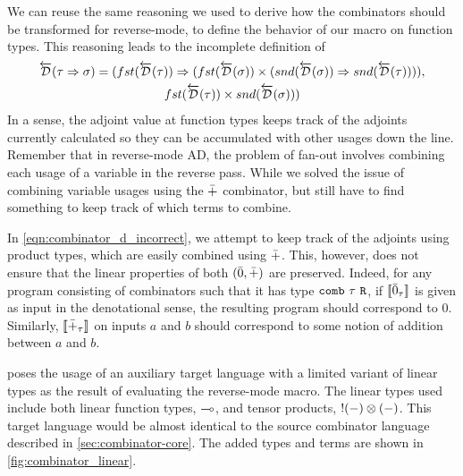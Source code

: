   We can reuse the same reasoning we used to derive how the combinators should be transformed for reverse-mode, to define the behavior of our macro on function types.
  This reasoning leads to the incomplete definition of
  \begin{multline}
    \overleftarrow{\mathcal{D}}(\tau \Rightarrow \sigma) = (fst(\overleftarrow{\mathcal{D}}(\tau)) \Rightarrow (fst(\overleftarrow{\mathcal{D}}(\sigma)) \times (snd(\overleftarrow{\mathcal{D}}(\sigma)) \Rightarrow snd(\overleftarrow{\mathcal{D}}(\tau)))),
      \\ fst(\overleftarrow{\mathcal{D}}(\tau)) \times snd (\overleftarrow{\mathcal{D}}(\sigma)))
    \label{eqn:combinator_d_incorrect}
  \end{multline}
  In a sense, the adjoint value at function types keeps track of the adjoints currently calculated so they can be accumulated with other usages down the line.
  Remember that in reverse-mode AD, the problem of fan-out involves combining each usage of a variable in the reverse pass.
  While we solved the issue of combining variable usages using the $\bar{+}$ combinator, but still have to find something to keep track of which terms to combine.

  In \cref{eqn:combinator_d_incorrect}, we attempt to keep track of the adjoints using product types, which are easily combined using $\bar{+}$.
  This, however, does not ensure that the linear properties of both $(\bar{0}, \bar{+})$ are preserved.
  Indeed, for any program consisting of combinators such that it has type $\texttt{comb}\ \tau\ \texttt{R}$, if $\llbracket \bar{0}_\tau \rrbracket$ is given as input in the denotational sense, the resulting program should correspond to $0$.
  Similarly, $\llbracket \bar{+}_\tau \rrbracket$ on inputs $a$ and $b$ should correspond to some notion of addition between $a$ and $b$.

  \Vakar{} poses the usage of an auxiliary target language with a limited variant of linear types as the result of evaluating the reverse-mode macro\cite{vkr2020reverse}.
  The linear types used include both linear function types, $\multimap$, and tensor products, $!(-)\otimes(-)$.
  This target language would be almost identical to the source combinator language described in \cref{sec:combinator-core}.
  The added types and terms are shown in \cref{fig:combinator_linear}.

